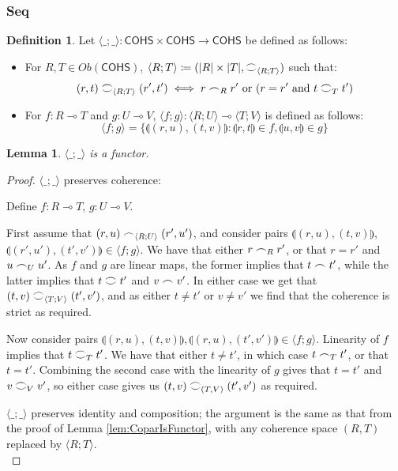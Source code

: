 \documentclass[11pt, oneside]{article}
\theoremstyle{plain}
\newtheorem{lemma}[theorem]{Lemma}
\theoremstyle{definition}
\newtheorem{definition}[theorem]{Definition}
\newcommand{\la}{\langle}
\newcommand{\ra}{\rangle}
\newcommand{\lp}{\llparenthesis}
\newcommand{\rp}{\rrparenthesis}
\newcommand{\cohs}{{\mathsf{COHS}}}
\newcommand{\coh}[1][]{\mathrel{\vcenter{\offinterlineskip\hbox{$\frown$}\vskip0.2ex\hbox{$\smile$}}_{\ifx\\#1\\\else#1\fi}}}
\newcommand{\scoh}[1][]{\mathrel{\frown}_{\ifx\\#1\\\else#1\fi}}
\begin{document}
\subsubsection{Seq}
\begin{definition}
    Let $\la\_;\_\ra:\cohs\times\cohs\to\cohs$ be defined as follows:
    \begin{itemize}
        \item
        For $R,T\in Ob(\cohs)$, $\la R;T\ra\coloneqq(|R|\times|T|,\coh[\la R;T\ra])$ such that:
        $$(r,t)\coh[\la R;T\ra](r',t') \iff r\scoh[R]r'\text{ or }(r=r'\text{ and }t\coh[T]t')$$

        \item
        For $f:R\multimap T$ and $g:U\multimap V$, 
        $\la f;g\ra:\la R;U\ra\multimap\la T;V\ra$ is defined as follows:
        $$\la f;g\ra=\{\lp(r,u),(t,v)\rp:\lp r,t\rp\in f,\lp u,v\rp\in g\}$$
    \end{itemize}
\end{definition}

\begin{lemma}
    $\la\_;\_\ra$ is a functor.
\end{lemma}

\begin{proof}

    $\la\_;\_\ra$ preserves coherence:
    \begin{adjustwidth}{1.5em}{}
        Define $f : R\multimap T$, $g : U\multimap V$.

        First assume that $(r,u)\scoh[\la R;U\ra](r',u')$, and consider pairs $\lp(r,u),(t,v)\rp$, $\lp(r',u'),(t',v')\rp\in \la f;g\ra$. 
        We have that either $r\scoh[R]r'$, or that $r=r'$ and $u\scoh[U]u'$.
        As $f$ and $g$ are linear maps, the former implies that $t\scoh t'$, while the latter implies that $t\coh t'$ and $v\scoh v'$.
        In either case we get that $(t,v)\coh[\la T;V\ra](t',v')$, and as either $t\neq t'$ or $v\neq v'$ we find that the coherence is strict as required.

        Now consider pairs $\lp(r,u),(t,v)\rp,\lp(r,u),(t',v')\rp\in\la f;g\ra$.
        Linearity of $f$ implies that $t\coh[T]t'$.
        We have that either $t\neq t'$, in which case $t\scoh[T]t'$, or that $t=t'$.
        Combining the second case with the linearity of $g$ gives that $t=t'$ and $v\coh[V]v'$, so either case gives us $(t,v)\coh[(T,V)](t',v')$ as required.
    \end{adjustwidth}

    $\la\_;\_\ra$ preserves identity and composition;
    the argument is the same as that from the proof of Lemma \ref{lem:CoparIsFunctor}, with any coherence space $(R,T)$ replaced by $\la R;T\ra$.\\
\end{proof}
\end{document}
